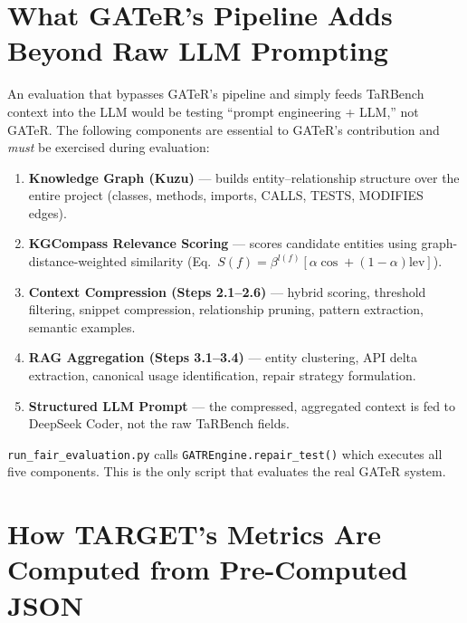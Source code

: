 \documentclass[11pt,a4paper]{article}
\begin{document}
\section{What GATeR's Pipeline Adds Beyond Raw LLM Prompting}
\label{sec:pipeline-value}

An evaluation that bypasses GATeR's pipeline and simply feeds TaRBench
context into the LLM would be testing ``prompt engineering + LLM,'' not
GATeR. The following components are essential to GATeR's contribution
and \emph{must} be exercised during evaluation:

\begin{enumerate}
    \item \textbf{Knowledge Graph (Kuzu)} --- builds entity--relationship
          structure over the entire project (classes, methods, imports,
          CALLS, TESTS, MODIFIES edges).
    \item \textbf{KGCompass Relevance Scoring} --- scores candidate
          entities using graph-distance-weighted similarity
          (Eq.~$S(f)=\beta^{l(f)}[\alpha\cos + (1{-}\alpha)\text{lev}]$).
    \item \textbf{Context Compression (Steps 2.1--2.6)} --- hybrid
          scoring, threshold filtering, snippet compression, relationship
          pruning, pattern extraction, semantic examples.
    \item \textbf{RAG Aggregation (Steps 3.1--3.4)} --- entity clustering,
          API delta extraction, canonical usage identification, repair
          strategy formulation.
    \item \textbf{Structured LLM Prompt} --- the compressed, aggregated
          context is fed to DeepSeek Coder, not the raw TaRBench fields.
\end{enumerate}

\texttt{run\_fair\_evaluation.py} calls \texttt{GATREngine.repair\_test()}
which executes all five components. This is the only script that
evaluates the real GATeR system.

\section{How TARGET's Metrics Are Computed from Pre-Computed JSON}
\label{sec:target-metrics}
\end{document}
